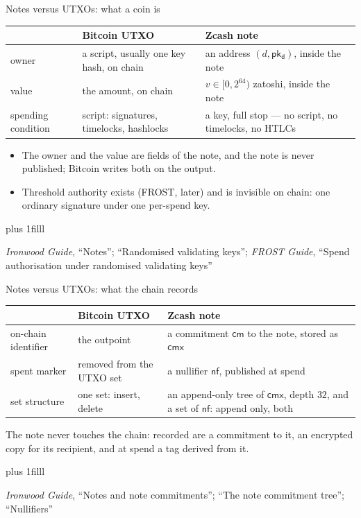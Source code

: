 \documentclass[aspectratio=169,11pt]{beamer}
\newcommand{\nfsym}{\ensuremath{\mathsf{nf}}}
\newcommand{\cmsym}{\ensuremath{\mathsf{cm}}}
\newcommand{\cmx}{\ensuremath{\mathsf{cmx}}}
\newcommand{\pkd}{\ensuremath{\mathsf{pk_d}}}
\newcommand{\src}[1]{\par\vskip0pt plus 1filll
  {\fontsize{6}{7.2}\selectfont\color{arbdim}\raggedright #1\par}}
\begin{document}
\begin{frame}{Notes versus UTXOs: what a coin is}
\begin{center}\small\raggedright
\begin{tabular}{@{}p{}p{}p{}@{}}
\toprule
 & Bitcoin UTXO & Zcash note \\
\midrule
owner & a script, usually one key hash, on chain & an address $(d, \pkd)$,
  inside the note \\
value & the amount, on chain & $v \in [0, 2^{64})$ zatoshi, inside the
  note \\
spending condition & script: signatures, timelocks, hashlocks & a key,
  full stop --- no script, no timelocks, no HTLCs \\
\bottomrule
\end{tabular}
\end{center}
\medskip
\begin{itemize}
  \item The owner and the value are fields of the note, and the note is
    never published; Bitcoin writes both on the output.
  \item Threshold authority exists (FROST, later) and is invisible on
    chain: one ordinary signature under one per-spend key.
\end{itemize}
\src{\emph{Ironwood Guide}, ``Notes''; ``Randomised validating keys'';
  \emph{FROST Guide}, ``Spend authorisation under randomised validating keys''}
\end{frame}

\begin{frame}{Notes versus UTXOs: what the chain records}
\begin{center}\small\raggedright
\begin{tabular}{@{}p{}p{}p{}@{}}
\toprule
 & Bitcoin UTXO & Zcash note \\
\midrule
on-chain identifier & the outpoint & a commitment $\cmsym$ to the note,
  stored as $\cmx$ \\
spent marker & removed from the UTXO set & a nullifier $\nfsym$,
  published at spend \\
set structure & one set: insert, delete & an append-only tree of $\cmx$,
  depth $32$, and a set of $\nfsym$: append only, both \\
\bottomrule
\end{tabular}
\end{center}
\medskip
The note never touches the chain: recorded are a commitment to it, an
encrypted copy for its recipient, and at spend a tag derived from it.
\src{\emph{Ironwood Guide}, ``Notes and note commitments''; ``The note
  commitment tree''; ``Nullifiers''}
\end{frame}
\end{document}
